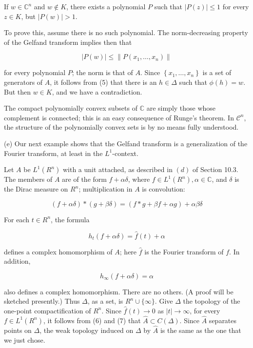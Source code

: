 \documentclass[10pt]{article}
\begin{document}
If $w \in \mathbb{C}^{n}$ and $w \notin K$, there exists a polynomial $P$ such that $|P(z)| \leq 1$ for every $z \in K$, but $|P(w)|>1$.

To prove this, assume there is no such polynomial. The norm-decreasing property of the Gelfand transform implies then that

$$
|P(w)| \leq\left\|P\left(x_{1}, \ldots, x_{n}\right)\right\|
$$

for every polynomial $P$; the norm is that of $A$. Since $\left\{x_{1}, \ldots, x_{n}\right\}$ is a set of generators of $A$, it follows from (5) that there is an $h \in \Delta$ such that $\phi(h)=w$. But then $w \in K$, and we have a contradiction.

The compact polynomially convex subsets of $\mathbb{C}$ are simply those whose complement is connected; this is an easy consequence of Runge's theorem. In $\mathscr{C}^{n}$, the structure of the polynomially convex sets is by no means fully understood.

(e) Our next example shows that the Gelfand transform is a generalization of the Fourier transform, at least in the $L^{1}$-context.

Let $A$ be $L^{1}\left(R^{n}\right)$ with a unit attached, as described in $(d)$ of Section 10.3. The members of $A$ are of the form $f+\alpha \delta$, where $f \in L^{1}\left(R^{n}\right), \alpha \in \mathbb{C}$, and $\delta$ is the Dirac measure on $R^{n}$; multiplication in $A$ is convolution:

$$
(f+\alpha \delta) *(g+\beta \delta)=(f * g+\beta f+\alpha g)+\alpha \beta \delta
$$

For each $t \in R^{n}$, the formula

$$
h_{t}(f+\alpha \delta)=\hat{f}(t)+\alpha
$$

defines a complex homomorphism of $A$; here $\hat{f}$ is the Fourier transform of $f$. In addition,

$$
h_{\infty}(f+\alpha \delta)=\alpha
$$

also defines a complex homomorphism. There are no others. (A proof will be sketched presently.) Thus $\Delta$, as a set, is $R^{n} \cup\{\infty\}$. Give $\Delta$ the topology of the one-point compactification of $R^{n}$. Since $\hat{f}(t) \rightarrow 0$ as $|t| \rightarrow \infty$, for every $f \in L^{1}\left(R^{n}\right)$, it follows from (6) and (7) that $\hat{A} \subset C(\Delta)$. Since $\hat{A}$ separates points on $\Delta$, the weak topology induced on $\Delta$ by $\hat{A}$ is the same as the one that we just chose.
\end{document}
